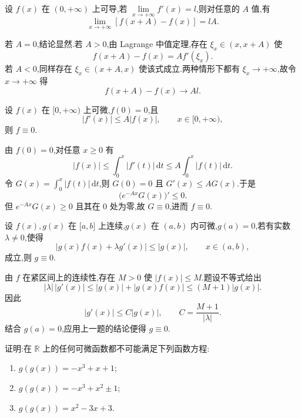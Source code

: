 \begin{example}
    设 $f(x)$ 在 $(0,+\infty)$ 上可导,若 $\displaystyle\lim\limits_{x\to+\infty}f'(x)=l$,则对任意的 $A$ 值,有
    \[
        \lim\limits_{x\to+\infty}[f(x+A)-f(x)]=lA.
    \]
\end{example}
\exampleblank

\begin{solution}
    若 $A=0$,结论显然.若 $A>0$,由 Lagrange 中值定理,存在 $\xi_x\in(x,x+A)$ 使
    \[
        f(x+A)-f(x)=Af'(\xi_x).
    \]
    若 $A<0$,同样存在 $\xi_x\in(x+A,x)$ 使该式成立.两种情形下都有 $\xi_x\to+\infty$,故令 $x\to+\infty$ 得
    \[
        f(x+A)-f(x)\longrightarrow Al.
    \]
\end{solution}

\begin{example}[\markstar]
    设 $f(x)$ 在 $\lbrack 0,+\infty)$ 上可微,$f(0)=0$,且
    \[
        |f'(x)|\leq A|f(x)|,
        \qquad x\in\lbrack 0,+\infty),
    \]
    则 $f\equiv0$.
\end{example}
\exampleblank

\begin{solution}
    由 $f(0)=0$,对任意 $x\geq0$ 有
    \[
        |f(x)|\leq\int_0^x|f'(t)|\,\mathrm{d}t
        \leq A\int_0^x|f(t)|\,\mathrm{d}t.
    \]
    令 $G(x)=\displaystyle\int_0^x|f(t)|\,\mathrm{d}t$,则 $G(0)=0$ 且 $G'(x)\leq AG(x)$.于是
    \[
        \bigl(e^{-Ax}G(x)\bigr)'\leq0.
    \]
    但 $e^{-Ax}G(x)\geq0$ 且其在 $0$ 处为零,故 $G\equiv0$,进而 $f\equiv0$.
\end{solution}

\begin{example}
    设 $f(x),g(x)$ 在 $\lbrack a,b\rbrack$ 上连续,$g(x)$ 在 $(a,b)$ 内可微,$g(a)=0$,若有实数 $\lambda\neq0$,使得
    \[
        |g(x)f(x)+\lambda g'(x)|\leq|g(x)|,
        \qquad x\in(a,b),
    \]
    成立,则 $g\equiv0$.
\end{example}
\exampleblank

\begin{solution}
    由 $f$ 在紧区间上的连续性,存在 $M>0$ 使 $|f(x)|\leq M$.题设不等式给出
    \[
        |\lambda|\,|g'(x)|
        \leq |g(x)|+|g(x)f(x)|
        \leq(M+1)|g(x)|.
    \]
    因此
    \[
        |g'(x)|\leq C|g(x)|,
        \qquad C=\dfrac{M+1}{|\lambda|}.
    \]
    结合 $g(a)=0$,应用上一题的结论便得 $g\equiv0$.
\end{solution}

\begin{example}
    证明:在 $\mathbb{R}$ 上的任何可微函数都不可能满足下列函数方程:
    \begin{enumerate}
        \item $g(g(x))=-x^3+x+1$;
        \item $g(g(x))=-x^3+x^2\pm1$;
        \item $g(g(x))=x^2-3x+3$.
    \end{enumerate}
\end{example}
\exampleblank


